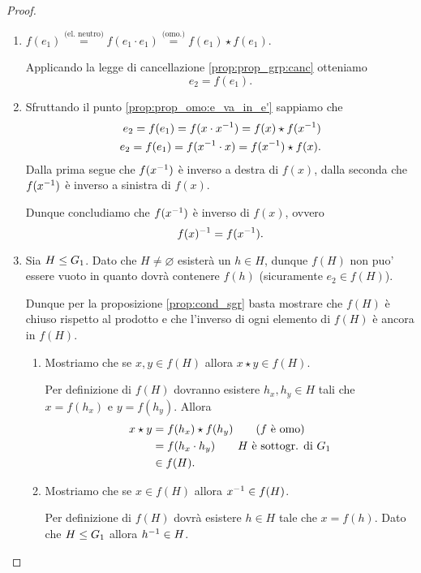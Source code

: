 \begin{proof}
    \begin{enumerate}[label={(\roman*)}]
        \item $f(e_1) \stackrel{\text{(el. neutro)}}{=} f(e_1 \cdot e_1) \stackrel{\text{(omo.)}}{=} f(e_1) \star f(e_1)$.
        
        Applicando la legge di cancellazione \ref{prop:prop_grp:canc} otteniamo \[
            e_2 = f(e_1).    
        \]
        \item Sfruttando il punto \ref{prop:prop_omo:e_va_in_e'} sappiamo che \begin{align*}
            e_2 = f(e_1) = f(x \cdot x^{-1}) = f(x)\star f(x^{-1}) \\
            e_2 = f(e_1) = f(x^{-1} \cdot x) = f(x^{-1})\star f(x).
        \end{align*} Dalla prima segue che $f(x^{-1})$ è inverso a destra di $f(x)$, dalla seconda che $f(x^{-1})$ è inverso a sinistra di $f(x)$.

        Dunque concludiamo che $f(x^{-1})$ è inverso di $f(x)$, ovvero \[
            f(x)^{-1} = f(x^{-1}).    
        \]
        \item Sia $H \leq G_1$. Dato che $H \neq \varnothing$ esisterà un $h \in H$, dunque $f(H)$ non puo' essere vuoto in quanto dovrà contenere $f(h)$ (sicuramente $e_2 \in f(H)$).
        
        Dunque per la proposizione \ref{prop:cond_sgr} basta mostrare che $f(H)$ è chiuso rispetto al prodotto e che l'inverso di ogni elemento di $f(H)$ è ancora in $f(H)$.

        \begin{enumerate}[label={(\arabic*)}]
            \item Mostriamo che se $x, y \in f(H)$ allora $x\star y \in f(H)$.
            
            Per definizione di $f(H)$ dovranno esistere $h_x, h_y \in H$ tali che $x = f(h_x)$ e $y = f(h_y)$. Allora \begin{align*}
                x\star y &= f(h_x)\star f(h_y) \tag*{\text{($f$ è omo)}}\\
                &= f(h_x \cdot h_y) \tag*{$H$ è sottogr. di $G_1$}\\
                &\in f(H).
            \end{align*}
            \item Mostriamo che se $x \in f(H)$ allora $x^{-1} \in f(H)$.
            
            Per definizione di $f(H)$ dovrà esistere $h \in H$ tale che $x = f(h)$. Dato che $H \leq G_1$ allora $h^{-1} \in H$.


\end{enumerate}
\end{enumerate}
\end{proof}
